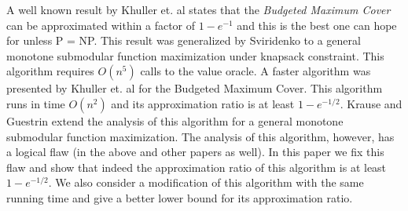 A well known result by Khuller et. al states that the \emph{Budgeted Maximum
Cover} can be approximated within a factor of $1-e^{-1}$ and this is the best one can hope for unless 
P = NP.
This result was generalized by Sviridenko to a general monotone submodular function maximization
under knapsack constraint. 
This algorithm requires $O(n^5)$ calls to the value oracle.
A faster algorithm was presented by Khuller et. al for the Budgeted Maximum Cover.  
This algorithm runs in time $O(n^2)$ and its approximation ratio is at least $1-e^{-1/2}$.
Krause and Guestrin extend the analysis of this algorithm
for a general monotone submodular function maximization. 
The analysis of this algorithm, however, has a logical flaw 
(in the above and other papers as well). 
In this paper we fix this flaw and show that indeed the approximation ratio of this
algorithm is at least $1-e^{-1/2}$. 
We also consider a modification of this algorithm with 
the same running time and give a better lower bound for its approximation ratio.
  
